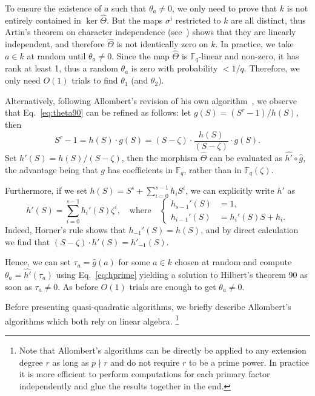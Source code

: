 \documentclass[12pt]{article}
\theoremstyle{plain}
\theoremstyle{definition}
\def\F{\ensuremath{\mathbb{F}}}
\newcounter{algorithm}
\begin{document}
To ensure the existence of $a$ such that $\theta_a\ne0$, we only need
to prove that $k$ is not entirely contained in $\ker\hat\Theta$. %
But the maps $\sigma^i$ restricted to $k$ are all distinct, thus
Artin's theorem on character independence (see~\cite[Ch~VI, Theorem~4.1]{lang})
shows that they are linearly 
independent, and therefore $\hat\Theta$ is not identically zero on $k$.
In practice, we take $a \in k$ at random until
$\theta_a\ne0$. Since the map $\hat\Theta$ is
$\F_q$-linear and non-zero, it has rank at least 1, thus a
random $\theta_a$ is zero with probability $< 1 / q$. Therefore, we only 
need $O(1)$ trials to find $\theta_1$ (and $\theta_2$).

Alternatively, following Allombert's revision of his own
algorithm~\cite{Allombert02-rev}, we observe that
Eq.~\eqref{eq:theta90} can be refined as follows: let
$g(S)=(S^r-1)/h(S)$, then
\begin{equation}
  \label{eq:theta90bis}
  S^r-1 = h(S)\cdot g(S) = (S-\zeta)\cdot \frac{h(S)}{(S-\zeta)} \cdot g(S).
\end{equation}
Set $h'(S)=h(S)/(S-\zeta)$, then the morphism $\hat\Theta$ can be evaluated
as $\hat{h'}\circ\hat{g}$, the advantage being that $g$ has
coefficients in $\F_q$, rather than in $\F_q(\zeta)$. %

Furthermore, if we set $h(S)=S^s+\sum_{i=0}^{s-1}h_iS^i$, we can
explicitly write $h'$ as
\begin{equation}
  \label{eq:hprime}
  h'(S)=\sum_{i=0}^{s-1}h_i'(S)\zeta^i,\quad
  \text{where}\quad
  \left\{\begin{aligned}
    h_{s-1}'(S) &= 1,\\
    h_{i-1}'(S) &= h_i'(S) S + h_i.
  \end{aligned}\right.
\end{equation}
Indeed, Horner's rule shows that $h_{-1}'(S)=h(S)$, and by direct
calculation we find that $(S-\zeta)\cdot h'(S) = h'_{-1}(S)$.

Hence, we can set $\tau_a = \hat{g}(a)$ for some $a\in k$ chosen at random
and compute $\theta_a = \hat{h'}(\tau_a)$ using Eq.~\eqref{eq:hprime}
yielding a solution to Hilbert's theorem 90 as soon as $\tau_a \neq 0$.
As before $O(1)$ trials are enough to get $\theta_a \neq 0$.

Before presenting quasi-quadratic algorithms, we briefly describe
Allombert's algorithms which both rely on linear algebra.%
\footnote{
Note that Allombert's algorithms can be directly be applied to any extension
degree $r$ as long as $p \nmid r$
and do not require $r$ to be a prime power.
In practice it is more efficient to perform computations
for each primary factor independently
and glue the results together in the end.
}
\end{document}
